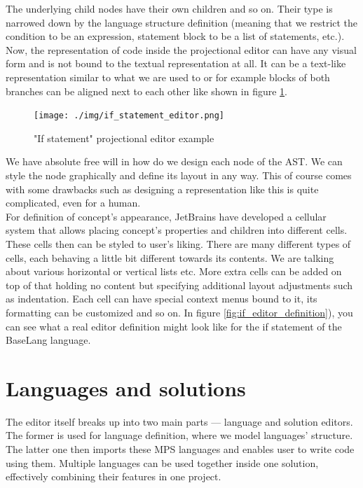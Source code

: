 The underlying child nodes have their own children and so on. Their type is narrowed down by the language structure definition (meaning that we restrict the condition to be an expression, statement block to be a list of statements, etc.). 
\\

Now, the representation of code inside the projectional editor can have any visual form and is not bound to the textual representation at all. It can be a text-like representation similar to what we are used to or for example blocks of both branches can be aligned next to each other like shown in figure \ref{fig:if_editor}.
\\

\begin{figure}[h]
	\centering
	\hspace{-4mm}
	\texttt{[image: ./img/if\_statement\_editor.png]}
	\caption{"If statement" projectional editor example}
	\label{fig:if_editor}
\end{figure}

We have absolute free will in how do we design each node of the AST. We can style the node graphically and define its layout in any way. This of course comes with some drawbacks such as designing a representation like this is quite complicated, even for a human.
\\

For definition of concept's appearance, JetBrains have developed a cellular system that allows placing concept's properties and children into different cells. These cells then can be styled to user's liking. There are many different types of cells, each behaving a little bit different towards its contents. We are talking about various horizontal or vertical lists etc. More extra cells can be added on top of that holding no content but specifying additional layout adjustments such as indentation. Each cell can have special context menus bound to it, its formatting can be customized and so on. In figure {\ref{fig:if_editor_definition})}, you can see what a real editor definition might look like for the if statement of the BaseLang language.

\section{Languages and solutions}

The editor itself breaks up into two main parts --- language and solution editors. The former is used for language definition, where we model languages' structure. The latter one then imports these MPS languages and enables user to write code using them. Multiple languages can be used together inside one solution, effectively combining their features in one project.

